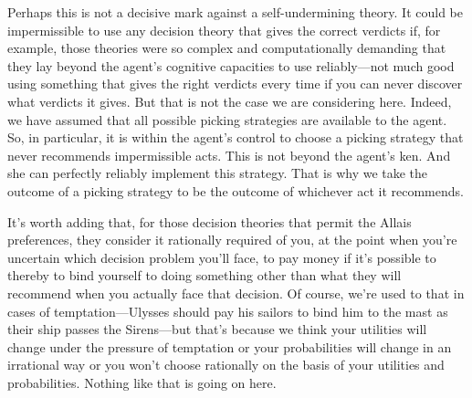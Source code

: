 \documentclass[a4paper]{article}
\newcommand\s{\mathsf{s}}
\renewcommand{\color}[1]{}
\newenvironment{CCM rewritten}
{\begingroup\color{blue}} %
{\endgroup}              %
\begin{document}
Perhaps this is not a decisive mark against a self-undermining theory. It could be impermissible to use any decision theory that gives the correct verdicts if, for example, those theories were so complex and computationally demanding that they lay beyond the agent's cognitive capacities to use reliably---not much good using something that gives the right verdicts every time if you can never discover what verdicts it gives. But that is not the case we are considering here. {Indeed, we have assumed that all possible picking strategies are available to the agent. So, in particular, it is within the agent's control to choose a picking strategy that never recommends impermissible acts. This is not beyond the agent's ken. And she can perfectly reliably implement this strategy. That is why we take the outcome of a picking strategy to be the outcome of whichever act it recommends.}


It's worth adding that, for those decision theories that permit the Allais preferences, they consider it rationally required of you, at the point when you're uncertain which decision problem you'll face, to pay money if it's possible to thereby to bind yourself to doing something other than what they will recommend when you actually face that decision. Of course, we're used to that in cases of temptation---Ulysses should pay his sailors to bind him to the mast as their ship passes the Sirens---but that's because we think your utilities will change under the pressure of temptation or your probabilities will change in an irrational way or you won't choose rationally on the basis of your utilities and probabilities. Nothing like that is going on here.

\end{document}
